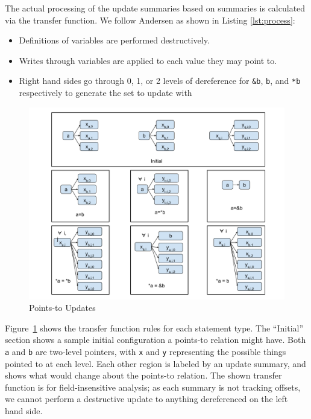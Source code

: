 The actual processing of the update summaries based on summaries is calculated via the transfer function.
We follow Andersen as shown in Listing \ref{lst:process}:
\begin{itemize}
\item Definitions of variables are performed destructively.
\item Writes through variables are applied to each value they may point to.
\item Right hand sides go through 0, 1, or 2 levels of dereference for \texttt{\&b}, \texttt{b}, and \texttt{*b} respectively to generate the set to update with
\end{itemize}

\begin{figure}
	\centering
	\includegraphics[scale=0.35]{alias/pts-update.pdf}
	\caption{Points-to Updates}
	\label{fig:pts-update}
\end{figure}

Figure~\ref{fig:pts-update} shows the transfer function rules for each
statement type.
The ``Initial'' section shows a sample initial configuration a points-to relation might have.
Both \texttt{a} and \texttt{b} are two-level pointers, with \texttt{x} and \texttt{y} representing the possible things pointed to at each level.
Each other region is labeled by an update summary, and shows what would change about the points-to relation.
The shown transfer function is for field-insensitive analysis; as each summary is not tracking offsets, we cannot perform a destructive update to anything dereferenced on the left hand side.

